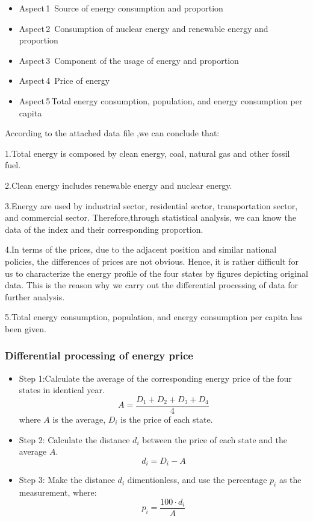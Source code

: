 \begin{itemize}
\item Aspect\,1 \,Source of energy consumption and proportion
\item Aspect\,2 \,Consumption of nuclear energy and renewable energy and proportion
\item Aspect\,3 \,Component of the usage of energy and  proportion
\item Aspect\,4 \,Price of energy
\item Aspect\,5\,Total energy consumption, population, and energy consumption per capita
\end{itemize}

According to the attached data file ,we can conclude that:


1.Total energy is composed by clean energy, coal, natural gas and other fossil fuel. 


2.Clean energy includes renewable energy and nuclear energy.


3.Energy are used by industrial sector, residential sector, transportation sector, and commercial sector.
Therefore,through statistical analysis, we can know the data of the index and their corresponding proportion. 


4.In terms of the prices, due to the adjacent position and similar national policies,  the differences of prices are not obvious. Hence, it is rather difficult for us to characterize the energy profile of the four states by figures depicting original data. This is the reason why we carry out the differential processing of data for further analysis. 


5.Total energy consumption, population, and energy consumption per capita has been given.


\subsubsection{Differential processing of energy price}
\begin{itemize}
\item Step 1:Calculate the average of the corresponding energy price of the four states in identical year. 
$$A=\frac{D_1+D_2+D_3+D_4}{4}$$
where $A $ is the average, $D_i$ is the price of each state.


\item Step 2: Calculate the distance $d_i$ between the price of each state and the average $A $. 
$$d_i=D_i-A$$

\item Step 3: Make the distance $d_i$ dimentionless, and use the percentage $p_i$ as the measurement, where: 
$$p_i=\frac{100\cdot d_i}{A}$$


\end{itemize}














